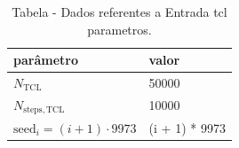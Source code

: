 \begin{table}[H]
\centering
\caption{Tabela - Dados referentes a Entrada tcl parametros.}
\label{tab:entrada_tcl_parametros}
\begin{tabular}{ll}
\toprule
parâmetro & valor \\
\midrule
$N_{\mathrm{TCL}}$ & 50000 \\
$N_{\mathrm{steps,TCL}}$ & 10000 \\
$\mathrm{seed}_i=(i+1)\cdot 9973$ & (i + 1) * 9973 \\
\bottomrule
\end{tabular}

\end{table}
